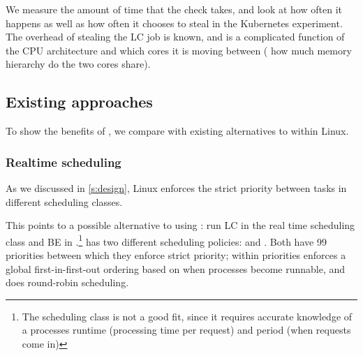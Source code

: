 We measure the amount of time that the \exit{} check takes, and look at how
often it happens as well as how often it chooses to steal in the Kubernetes
experiment. The overhead of stealing the LC job is known, and is a complicated
function of the CPU architecture and which cores it is moving between (\eg{} how
much memory hierarchy do the two cores share).



\subsection{Existing approaches}\label{ss:eval:existing}

To show the benefits of \schedbe{}, we compare with existing alternatives to
\cgroups{} within Linux.

\subsubsection{Realtime scheduling}

As we discussed in \autoref{s:design}, Linux enforces the strict priority
between tasks in different scheduling classes. 

This points to a possible alternative to using \cgroups{}: run LC in the real
time \rtclass{} scheduling class and BE in \normalclass{}.\footnote{The
\deadlineclass{} scheduling class is not a good fit, since it requires accurate
knowledge of a processes runtime (processing time per request) and period (when
requests come in)} \rtclass{} has two different scheduling policies:
\schedfifo{} and \schedrr{}. Both have 99 priorities between which they enforce
strict priority; within priorities \schedfifo{} enforces a global
first-in-first-out ordering based on when processes become runnable, and
\schedrr{} does round-robin scheduling.

